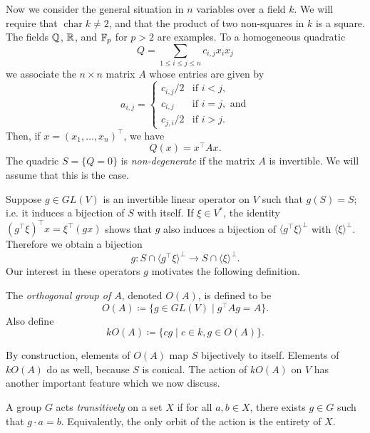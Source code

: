Now we consider the general situation in $n$ variables over a field $k$. We will require that $\operatorname{char} k \neq 2$, and that the product of two non-squares in $k$ is a square. The fields $\mathbb{Q}$, $\mathbb{R}$, and $\mathbb{F}_p$ for $p>2$ are examples. To a homogeneous quadratic
\[
	Q = \sum_{1 \leq i \leq j \leq n} c_{i,j} x_i x_j 
\]
we associate the $n\times n$ matrix $A$ whose entries are given by
\[
	a_{i,j} = \begin{cases}
		{c_{i,j}}/{2} & \text{if } i < j,\\
		c_{i,j} & \text{if } i = j, \text{ and}\\
		{c_{j,i}}/{2} & \text{if } i > j.
	\end{cases}
\]
Then, if $x = (x_1,\ldots,x_n)^\top$, we have
\[
	Q(x) = x^\top A x.
\]
The quadric $S = \{Q = 0\}$ is \emph{non-degenerate} if the matrix $A$ is invertible. We will assume that this is the case.

Suppose $g \in GL(V)$ is an invertible linear operator on $V$ such that $g(S) = S$; i.e. it induces a bijection of $S$ with itself. If $\xi \in V^*$, the identity $(g^\top \xi)^\top x = \xi^\top (gx)$ shows that $g$ also induces a bijection of $\langle g^\top \xi \rangle^\bot$ with $\langle \xi \rangle^\bot$. Therefore we obtain a bijection
\begin{equation}\label{eq:S-operator-hyperplane-bijection}
	g\colon S \cap \langle g^\top \xi \rangle^\bot \to S \cap \langle \xi \rangle^\bot.
\end{equation}
Our interest in these operators $g$ motivates the following definition.
\begin{defn}
	The \emph{orthogonal group of $A$}, denoted $O(A)$, is defined to be
	\[
		O(A) \coloneqq \{ g \in GL(V) \mid g^\top A g = A\}.
	\]
	Also define
	\[
		kO(A) \coloneqq \{ cg \mid c\in k, g\in O(A)\}.
	\]
\end{defn}
By construction, elements of $O(A)$ map $S$ bijectively to itself. Elements of $kO(A)$ do as well, because $S$ is conical. The action of $kO(A)$ on $V$ has another important feature which we now discuss. 
\begin{defn}
	A group $G$ acts \emph{transitively} on a set $X$ if for all $a,b\in X$, there exists $g\in G$ such that $g\cdot a = b$. Equivalently, the only orbit of the action is the entirety of $X$.
\end{defn}

